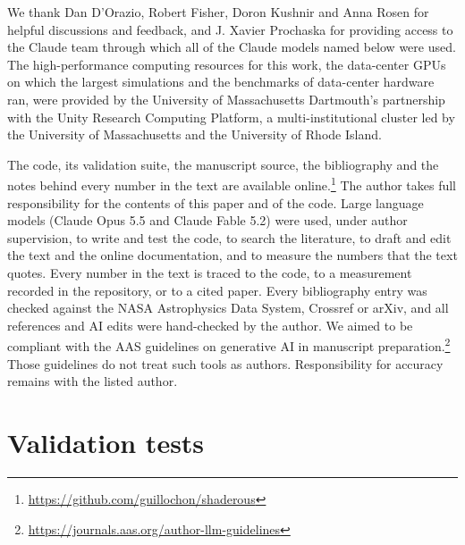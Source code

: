\documentclass[twocolumn]{aastex701}
\begin{document}
\begin{acknowledgments}
We thank Dan D'Orazio, Robert Fisher, Doron Kushnir and Anna Rosen for helpful discussions and feedback, and J. Xavier Prochaska for providing access to the Claude team through which all of the Claude models named below were used. The high-performance computing resources for this work, the data-center GPUs on which the largest simulations and the benchmarks of data-center hardware ran, were provided by the University of Massachusetts Dartmouth's partnership with the Unity Research Computing Platform, a multi-institutional cluster led by the University of Massachusetts and the University of Rhode Island.

The code, its validation suite, the manuscript source, the bibliography and the notes behind every number in the text are available online.\footnote{\url{https://github.com/guillochon/shaderous}} The author takes full responsibility for the contents of this paper and of the code. Large language models (Claude Opus 5.5 and Claude Fable 5.2) were used, under author supervision, to write and test the code, to search the literature, to draft and edit the text and the online documentation, and to measure the numbers that the text quotes. Every number in the text is traced to the code, to a measurement recorded in the repository, or to a cited paper. Every bibliography entry was checked against the NASA Astrophysics Data System, Crossref or arXiv, and all references and AI edits were hand-checked by the author. We aimed to be compliant with the AAS guidelines on generative AI in manuscript preparation.\footnote{\url{https://journals.aas.org/author-llm-guidelines}} Those guidelines do not treat such tools as authors. Responsibility for accuracy remains with the listed author.
\end{acknowledgments}


\appendix

\section{Validation tests}
\label{sec:validationtests}
\end{document}
